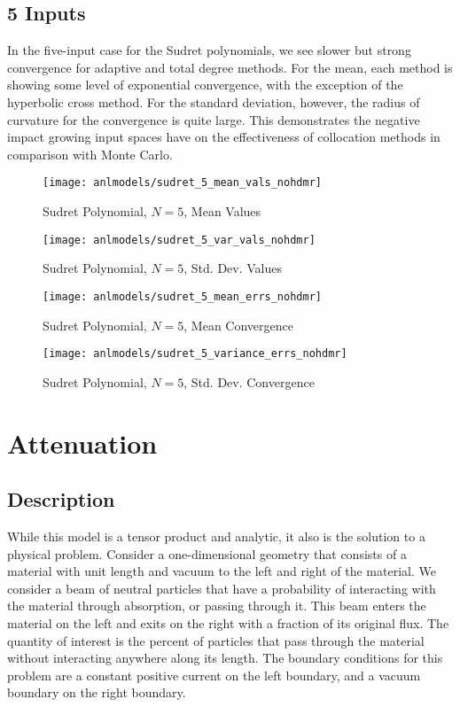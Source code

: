 \subsection{5 Inputs}
In the five-input case for the Sudret polynomials, we see slower but strong convergence for adaptive and
total degree methods.
For the mean, each method is showing some level of exponential convergence, with the exception of the
hyperbolic cross method.  For the standard deviation,
however, the radius of curvature for the convergence is quite large.  This demonstrates the negative impact
growing input spaces have on the effectiveness of collocation methods in comparison with Monte Carlo.
\begin{figure}[H]
  \centering
  \texttt{[image: anlmodels/sudret\_5\_mean\_vals\_nohdmr]}
  \caption{Sudret Polynomial, $N=5$, Mean Values}
  \label{fig:sudretpoly mean values 5}
\end{figure}
\begin{figure}[H]
  \centering
  \texttt{[image: anlmodels/sudret\_5\_var\_vals\_nohdmr]}
  \caption{Sudret Polynomial, $N=5$, Std. Dev. Values}
  \label{fig:sudretpoly var values 5}
\end{figure}

\begin{figure}[H]
  \centering
  \texttt{[image: anlmodels/sudret\_5\_mean\_errs\_nohdmr]}
  \caption{Sudret Polynomial, $N=5$, Mean Convergence}
  \label{fig:sudretpoly mean errors 5}
\end{figure}
\begin{figure}[H]
  \centering
  \texttt{[image: anlmodels/sudret\_5\_variance\_errs\_nohdmr]}
  \caption{Sudret Polynomial, $N=5$, Std. Dev. Convergence}
  \label{fig:sudretpoly var errors 5}
\end{figure}


\section{Attenuation}
\subsection{Description}
While this model is a tensor product and analytic, it also is the solution to a physical problem.
Consider a one-dimensional geometry that consists of a material with unit length and vacuum to the left and
right of the material.  We consider a beam of neutral particles that have a probability of interacting
with the material through absorption, or passing through it.  This beam enters the material on the left
and exits on the right with a fraction of its original flux.
The quantity of interest is the percent of particles that pass through the material without interacting
anywhere along its length.  The boundary conditions for this problem are a constant positive current on the 
left boundary, and a vacuum boundary on the right boundary.

